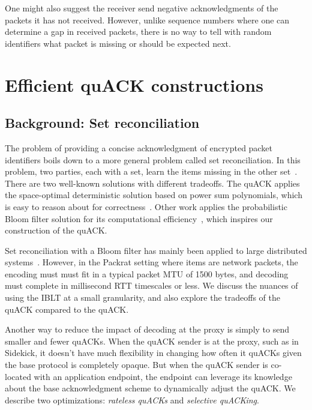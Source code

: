 \smallskip

One might also suggest the receiver send negative acknowledgments of the packets
it has not received. However, unlike sequence numbers where one can
determine a gap in received packets, there is no way to tell with random
identifiers what packet is missing or should be expected next.

\section{Efficient quACK constructions}
\label{sec:quack:constructions}



\subsection{Background: Set reconciliation}
\label{sec:quack:constructions:background}

The problem of providing a concise acknowledgment of encrypted packet identifiers
boils down to a more general problem called set reconciliation. In this problem,
two parties, each with a set, learn the items missing in the other
set~\cite{minsky2003set,eppstein2011straggler}.
There are two well-known solutions with different tradeoffs. The quACK
applies the space-optimal deterministic solution based on
power sum polynomials, which is easy to reason about for correctness~\cite{yuan2024sidekick}.
Other work applies the probabilistic Bloom filter solution
for its computational efficiency~\cite{yang2024practical,summermatter2021byzantine},
which inspires our construction of the quACK.

Set reconciliation with a Bloom filter has mainly been applied to large distributed systems~\cite
{yang2024practical,summermatter2021byzantine}. However, in the Packrat setting
where items are network packets, the encoding must must fit in a typical packet
MTU of 1500 bytes, and decoding must complete in millisecond RTT timescales or
less. We discuss the nuances of using the IBLT at a small granularity, and
also explore the tradeoffs of the quACK compared to the quACK.

Another way to reduce the impact of decoding at the proxy is simply to send smaller
and fewer quACKs. When the quACK sender is at the proxy, such as in Sidekick,
it doesn't have much flexibility in changing how often it quACKs given
the base protocol is completely opaque. But when the quACK sender is co-located
with an application endpoint, the endpoint can leverage its knowledge about the
base acknowledgment scheme to dynamically adjust the quACK.
We describe two optimizations: \textit{rateless quACKs} and \textit{selective quACKing}.

